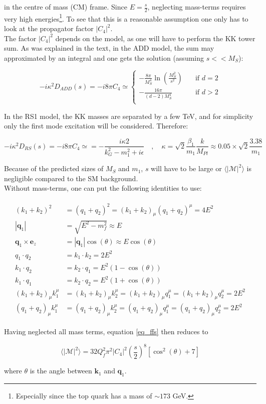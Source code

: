 \documentclass[11pt,a4paper]{article}
\begin{document}
in the centre of mass (CM) frame. Since $E = \frac{s}{2}$, neglecting mass-terms requires very high energies\footnote{Especially since the top quark has a mass of $\sim 173$ GeV.}. To see that this is a reasonable assumption one only has to look at the propagator factor $|C_4|^2$.\\
The factor $|C_4|^2$ depends on the model, as one will have to perform the KK tower sum. As was explained in the text, in the ADD model, the sum may approximated by an integral and one gets the solution (assuming $s<<M_S$):

\begin{equation}
	-i\kappa^2D_{ADD}(s) = -i8\pi C_4\simeq
	\begin{cases}
	-\frac{8\pi}{M_S^4}\ln\left(\frac{M_S^2}{s^2}\right)       & \quad \text{if } d=2\\
	-\frac{16\pi}{(d-2)M_S^4}  & \quad \text{if } d>2\\
	\end{cases}
\end{equation}

In the RS1 model, the KK masses are separated by a few TeV, and for simplicity only the first mode excitation will be considered. Therefore:

\begin{equation}
	-i\kappa^2D_{RS}(s) = -i8\pi C_4\simeq = -\frac{i\kappa 2}{k_G^2 - m_1^2 + i\epsilon}\quad,\quad \kappa = \sqrt{2}\frac{\beta_1}{m_1}\frac{k}{M_{Pl}} \approx 0.05\times\sqrt{2}\frac{3.38}{m_1}
\end{equation}

Because of the predicted sizes of $M_S$ and $m_1$, $s$ will have to be large or $\langle|\mathcal{M}|^2\rangle$ is negligible compared to the SM background.\\
Without mass-terms, one can put the following identities to use:

\begin{align}
	\begin{split}
	(k_1+k_2)^2 &= (q_1 + q_2)^2 = (k_1+k_2)_\mu(q_1+q_2)^\mu = 4E^2\\
	|\bm{q}_1| &= \sqrt{E^2 - m_f^2} \approx E\\
	\bm{q}_1\times \bm{e}_z &= |\bm{q}_1|\cos(\theta) \approx E\cos(\theta)\\
	q_1\cdot q_2 &= k_1\cdot k_2 = 2E^2\\
	k_1\cdot q_2 &= k_2\cdot q_1 = E^2(1-\cos(\theta))\\
	k_1\cdot q_1 &= k_2\cdot q_2 = E^2(1+\cos(\theta))\\
	(k_1+k_2)_\mu k_1^\mu &= (k_1+k_2)_\mu k_2^\mu = (k_1+k_2)_\mu q_1^\mu = (k_1+k_2)_\mu q_2^\mu = 2E^2\\
	(q_1+q_2)_\mu k_1^\mu &= (q_1+q_2)_\mu k_2^\mu = (q_1+q_2)_\mu q_1^\mu = (q_1+q_2)_\mu q_2^\mu = 2E^2
	\end{split}
\end{align}

Having neglected all mass terms, equation \ref{eq_ffs} then reduces to

\begin{equation}
	\langle|\mathcal{M}|^2\rangle = 32Q_f^2\pi^2|C_4|^2 \left(\frac{s}{2}\right)^8\left[\cos^2(\theta) + 7\right]
\end{equation}

where $\theta$ is the angle between $\bm{k}_1$ and $\bm{q}_1$.
\end{document}
